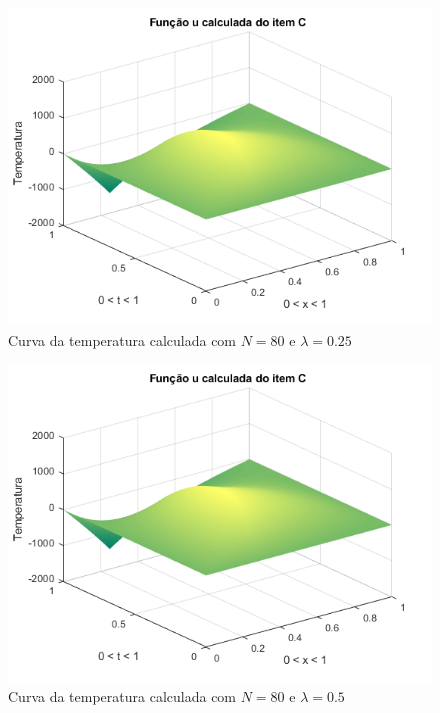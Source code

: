 \documentclass[12pt]{article}
\begin{document}
\begin{spacing}{1.5}
\begin{figure}
    \centering
    \includegraphics[width=0.8\linewidth]{Primeira_Tarefa/ItemC/n80_lambda0-25_calc.png}
    \caption{Curva da temperatura calculada com $N=80$ e $\lambda=0.25$}
    \label{fig:C_n80lambda0-25_exata}
\end{figure}
\begin{figure}
    \centering
    \includegraphics[width=0.8\linewidth]{Primeira_Tarefa/ItemC/n80_lambda0-5_calc.png}
    \caption{Curva da temperatura calculada com $N=80$ e $\lambda=0.5$}
    \label{fig:C_n80lambda0-5_calc}
\end{figure}



\end{spacing}
\end{document}
